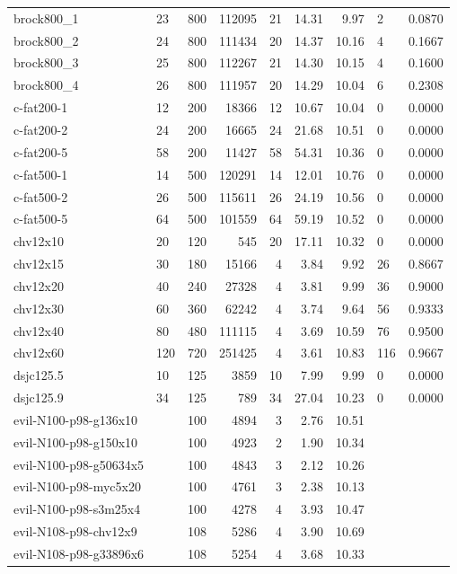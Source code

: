 \begin{longtable}{llrrrrrll}
brock800\_1 & 23 & 800 & 112095 & 21 & 14.31 & 9.97 & 2 & 0.0870 \\
brock800\_2 & 24 & 800 & 111434 & 20 & 14.37 & 10.16 & 4 & 0.1667 \\
brock800\_3 & 25 & 800 & 112267 & 21 & 14.30 & 10.15 & 4 & 0.1600 \\
brock800\_4 & 26 & 800 & 111957 & 20 & 14.29 & 10.04 & 6 & 0.2308 \\
c-fat200-1 & 12 & 200 & 18366 & 12 & 10.67 & 10.04 & 0 & 0.0000 \\
c-fat200-2 & 24 & 200 & 16665 & 24 & 21.68 & 10.51 & 0 & 0.0000 \\
c-fat200-5 & 58 & 200 & 11427 & 58 & 54.31 & 10.36 & 0 & 0.0000 \\
c-fat500-1 & 14 & 500 & 120291 & 14 & 12.01 & 10.76 & 0 & 0.0000 \\
c-fat500-2 & 26 & 500 & 115611 & 26 & 24.19 & 10.56 & 0 & 0.0000 \\
c-fat500-5 & 64 & 500 & 101559 & 64 & 59.19 & 10.52 & 0 & 0.0000 \\
chv12x10 & 20 & 120 & 545 & 20 & 17.11 & 10.32 & 0 & 0.0000 \\
chv12x15 & 30 & 180 & 15166 & 4 & 3.84 & 9.92 & 26 & 0.8667 \\
chv12x20 & 40 & 240 & 27328 & 4 & 3.81 & 9.99 & 36 & 0.9000 \\
chv12x30 & 60 & 360 & 62242 & 4 & 3.74 & 9.64 & 56 & 0.9333 \\
chv12x40 & 80 & 480 & 111115 & 4 & 3.69 & 10.59 & 76 & 0.9500 \\
chv12x60 & 120 & 720 & 251425 & 4 & 3.61 & 10.83 & 116 & 0.9667 \\
dsjc125.5 & 10 & 125 & 3859 & 10 & 7.99 & 9.99 & 0 & 0.0000 \\
dsjc125.9 & 34 & 125 & 789 & 34 & 27.04 & 10.23 & 0 & 0.0000 \\
evil-N100-p98-g136x10 &  & 100 & 4894 & 3 & 2.76 & 10.51 &  &  \\
evil-N100-p98-g150x10 &  & 100 & 4923 & 2 & 1.90 & 10.34 &  &  \\
evil-N100-p98-g50634x5 &  & 100 & 4843 & 3 & 2.12 & 10.26 &  &  \\
evil-N100-p98-myc5x20 &  & 100 & 4761 & 3 & 2.38 & 10.13 &  &  \\
evil-N100-p98-s3m25x4 &  & 100 & 4278 & 4 & 3.93 & 10.47 &  &  \\
evil-N108-p98-chv12x9 &  & 108 & 5286 & 4 & 3.90 & 10.69 &  &  \\
evil-N108-p98-g33896x6 &  & 108 & 5254 & 4 & 3.68 & 10.33 &  &  \\

\end{longtable}

